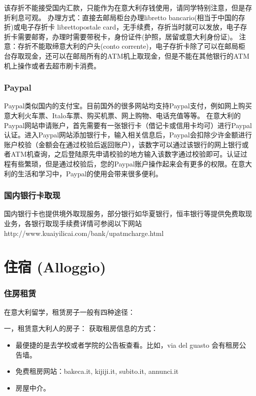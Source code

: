 \documentclass[3pt,a5paper,openright,twoside]{book}
\begin{document}
该存折不能接受国内汇款，只能作为在意大利存钱使用，请同学特别注意，但是存折利息可观。
办理方式：直接去邮局柜台办理libretto bancario(相当于中国的存折)或电子存折卡 librettopostale card，无手续费，存折当时就可以发放，电子存折卡需要邮寄，办理时需要带税卡，身份证件(护照，居留或意大利身份证)。
注意：存折不能取缔意大利的户头(conto corrente)，电子存折卡除了可以在邮局柜台存取现金，还可以在邮局所有的ATM机上取现金，但是不能在其他银行的ATM机上操作或者去超市刷卡消费。

\subsubsection{Paypal}

Paypal类似国内的支付宝。目前国外的很多网站均支持Paypal支付，例如网上购买意大利火车票、Italo车票、购买机票、网上购物、电话充值等等。
在意大利的Paypal网站申请账户，首先需要有一张银行卡（借记卡或信用卡均可）进行Paypal认证。进入Paypal网站添加银行卡，输入相关信息后，Paypal会扣除少许金额进行账户校验（金额会在通过校验后返回账户），该数字可以通过该银行的网上银行或者ATM机查询，之后登陆原先申请校验的地方输入该数字通过校验即可。认证过程有些繁琐，但是通过校验后，您的Paypal账户操作起来会有更多的权限。在意大利的生活和学习中，Paypal的使用会带来很多便利。

\subsubsection{国内银行卡取现}
国内银行卡也提供境外取现服务，部分银行如华夏银行，恒丰银行等提供免费取现业务，各银行取现手续费详情可参阅以下网站\\
 http://www.kuaiyilicai.com/bank/upatmcharge.html

\section{住宿 (Alloggio)}
\subsubsection{住房租赁}

在意大利留学，租赁房子一般有四种途径：

一，租赁意大利人的房子：
获取租房信息的方式：
\begin{itemize}
	\item 最便捷的是去学校或者学院的公告板查看。比如，via del guasto 会有租房公告墙。
	\item 免费租房网站：bakeca.it, kijiji.it,  subito.it, annunci.it
	\item 房屋中介。
\end{itemize} 
\end{document}
